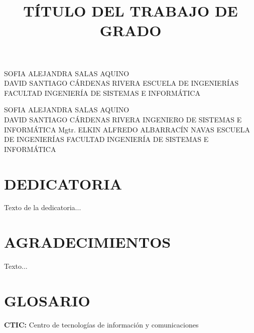 \documentclass[spanish]{ieee_upb}
\title{TÍTULO DEL TRABAJO DE GRADO}
\date{\the\year}
\begin{document}
{SOFIA ALEJANDRA SALAS AQUINO \\ DAVID SANTIAGO CÁRDENAS RIVERA}
{ESCUELA DE INGENIERÍAS}
{FACULTAD INGENIERÍA DE SISTEMAS E INFORMÁTICA}

\newpage
{}
{SOFIA ALEJANDRA SALAS AQUINO \\ DAVID SANTIAGO CÁRDENAS RIVERA}
{INGENIERO DE SISTEMAS E INFORMÁTICA}
{Mgtr. ELKIN ALFREDO ALBARRACÍN NAVAS}
{ESCUELA DE INGENIERÍAS}
{FACULTAD INGENIERÍA DE SISTEMAS E INFORMÁTICA}

\newpage
\section*{DEDICATORIA}
Texto de la dedicatoria...

\clearpage
\section*{AGRADECIMIENTOS}
Texto...

\clearpage
\renewcommand\contentsname{\hfill\normalfont\bfseries CONTENIDO\hfill}
\tableofcontents

\renewcommand{\thetable}{\Roman{table}}


\makeatletter
\renewcommand{\numberline}[1]{%
  \stepcounter{tabindexcounter}%
  Tabla~\arabic{tabindexcounter}~%
}
\makeatother


\newpage
{} 
\renewcommand\listtablename{\hfill\normalfont\bfseries LISTA DE TABLAS\hfill}
\listoftables

\newpage
\renewcommand\listfigurename{\hfill\normalfont\bfseries LISTA DE FIGURAS\hfill}
\listoffigures



\newpage
\section*{GLOSARIO}
\textbf{CTIC: } Centro de tecnologías de información y comunicaciones
\end{document}
